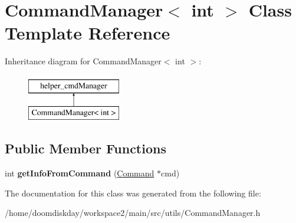 \hypertarget{classCommandManager_3_01int_01_4}{}\section{Command\+Manager$<$ int $>$ Class Template Reference}
\label{classCommandManager_3_01int_01_4}
Inheritance diagram for Command\+Manager$<$ int $>$\+:\begin{figure}[H]
\begin{center}
\leavevmode
\includegraphics[height=2.000000cm]{classCommandManager_3_01int_01_4}
\end{center}
\end{figure}
\subsection*{Public Member Functions}
\begin{DoxyCompactItemize}
\item 
int {\bfseries get\+Info\+From\+Command} (\hyperlink{classCommand}{Command} $\ast$cmd)\hypertarget{classCommandManager_3_01int_01_4_aa9e1e98538e24030a1d0cdc527066019}{}\label{classCommandManager_3_01int_01_4_aa9e1e98538e24030a1d0cdc527066019}

\end{DoxyCompactItemize}


The documentation for this class was generated from the following file\+:\begin{DoxyCompactItemize}
\item 
/home/doomdiskday/workspace2/main/src/utils/Command\+Manager.\+h\end{DoxyCompactItemize}
